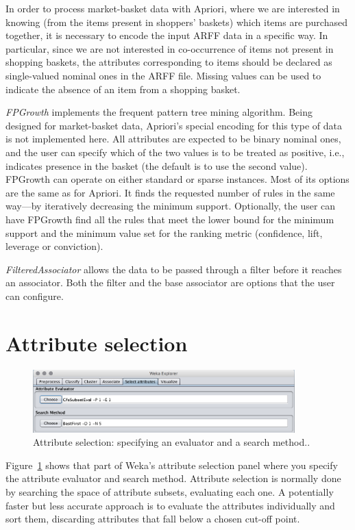 In order to process market-basket data with Apriori, where we are
interested in knowing (from the items present in shoppers' baskets)
which items are purchased together, it is necessary to encode the
input ARFF data in a specific way. In particular, since we are not
interested in co-occurrence of items not present in shopping baskets,
the attributes corresponding to items should be declared as
single-valued nominal ones in the ARFF file. Missing values can be
used to indicate the absence of an item from a shopping basket.

\textit{FPGrowth} implements the frequent pattern tree mining
algorithm. Being designed for market-basket data, Apriori's special
encoding for this type of data is not implemented here. All attributes
are expected to be binary nominal ones, and the user can specify which
of the two values is to be treated as positive, i.e., indicates
presence in the basket (the default is to use the second
value). FPGrowth can operate on either standard or sparse
instances. Most of its options are the same as for Apriori. It finds
the requested number of rules in the same way—by iteratively
decreasing the minimum support. Optionally, the user can have FPGrowth
find all the rules that meet the lower bound for the minimum support
and the minimum value set for the ranking metric (confidence, lift,
leverage or conviction).

\textit{FilteredAssociator} allows the data to be passed through a
filter before it reaches an associator. Both the filter and the base
associator are options that the user can configure.

\section{Attribute selection}

\begin{figure}[!th]
\centering
\includegraphics[width=0.9\textwidth]{images/B2_30.png}
\caption{Attribute selection: specifying an evaluator and a search method..}
\label{fig:att_selection_config}
\end{figure}

Figure~\ref{fig:att_selection_config} shows that part of Weka's
attribute selection panel where you specify the attribute evaluator
and search method. Attribute selection is normally done by searching
the space of attribute subsets, evaluating each one. A potentially
faster but less accurate approach is to evaluate the attributes
individually and sort them, discarding attributes that fall below a
chosen cut-off point.

